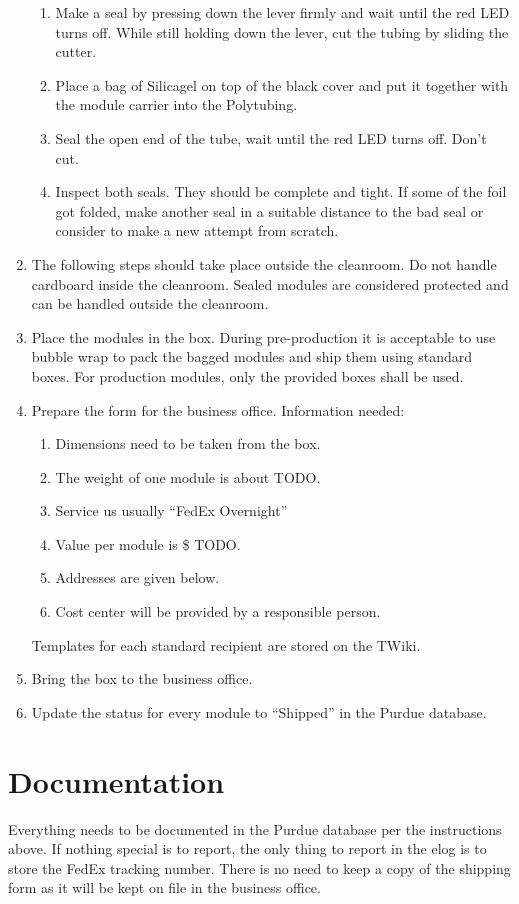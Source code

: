 \documentclass[12pt]{unlsilabsop}
\begin{document}
\begin{enumerate}
\begin{enumerate}
        \item Make a seal by pressing down the lever firmly and wait until the red LED turns off. While still holding down the lever, cut the tubing by sliding the cutter.
        \item Place a bag of Silicagel on top of the black cover and put it together with the module carrier into the Polytubing.
        \item Seal the open end of the tube, wait until the red LED turns off. Don't cut.
        \item Inspect both seals. They should be complete and tight. If some of the foil got folded, make another seal in a suitable distance to the bad seal or consider to make a new attempt from scratch.
    \end{enumerate}
    \item The following steps should take place outside the cleanroom. Do not handle cardboard inside the cleanroom. Sealed modules are considered protected and can be handled outside the cleanroom.
    \item Place the modules in the box. During pre-production it is acceptable to use bubble wrap to pack the bagged modules and ship them using standard boxes. For production modules, only the provided boxes shall be used.
    \item Prepare the form for the business office. Information needed:
    \begin{enumerate}
        \item Dimensions need to be taken from the box.
        \item The weight of one module is about TODO.
        \item Service us usually ``FedEx Overnight''
        \item Value per module is \$ TODO.
        \item Addresses are given below.
        \item Cost center will be provided by a responsible person.
    \end{enumerate}
    Templates for each standard recipient are stored on the TWiki.
    \item Bring the box to the business office. 
    \item Update the status for every module to ``Shipped'' in the Purdue database.
\end{enumerate}

\section{Documentation}
Everything needs to be documented in the Purdue database per the instructions above. If nothing special is to report, the only thing to report in the elog is to store the FedEx tracking number. There is no need to keep a copy of the shipping form as it will be kept on file in the business office.
\end{document}
